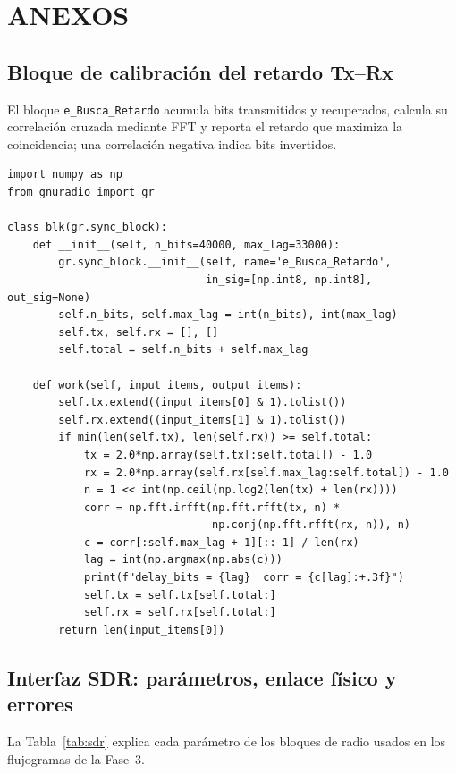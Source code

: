 

\section{ANEXOS}

\subsection{Bloque de calibración del retardo Tx--Rx}
\label{app:retardo}

El bloque \texttt{e\_Busca\_Retardo} acumula bits transmitidos y recuperados, calcula su correlación cruzada mediante FFT y reporta el retardo que maximiza la coincidencia; una correlación negativa indica bits invertidos.

\begin{lstlisting}[style=bonito,
                   caption={Bloque \texttt{e\_Busca\_Retardo} para calibrar \texttt{delay\_bits}},
                   label={lst:retardo}]
import numpy as np
from gnuradio import gr

class blk(gr.sync_block):
    def __init__(self, n_bits=40000, max_lag=33000):
        gr.sync_block.__init__(self, name='e_Busca_Retardo',
                               in_sig=[np.int8, np.int8], out_sig=None)
        self.n_bits, self.max_lag = int(n_bits), int(max_lag)
        self.tx, self.rx = [], []
        self.total = self.n_bits + self.max_lag

    def work(self, input_items, output_items):
        self.tx.extend((input_items[0] & 1).tolist())
        self.rx.extend((input_items[1] & 1).tolist())
        if min(len(self.tx), len(self.rx)) >= self.total:
            tx = 2.0*np.array(self.tx[:self.total]) - 1.0
            rx = 2.0*np.array(self.rx[self.max_lag:self.total]) - 1.0
            n = 1 << int(np.ceil(np.log2(len(tx) + len(rx))))
            corr = np.fft.irfft(np.fft.rfft(tx, n) *
                                np.conj(np.fft.rfft(rx, n)), n)
            c = corr[:self.max_lag + 1][::-1] / len(rx)
            lag = int(np.argmax(np.abs(c)))
            print(f"delay_bits = {lag}  corr = {c[lag]:+.3f}")
            self.tx = self.tx[self.total:]
            self.rx = self.rx[self.total:]
        return len(input_items[0])
\end{lstlisting}

\subsection{Interfaz SDR: parámetros, enlace físico y errores}
\label{app:sdr}
La Tabla~\ref{tab:sdr} explica cada parámetro de los bloques de radio usados en los flujogramas de la Fase~3.

